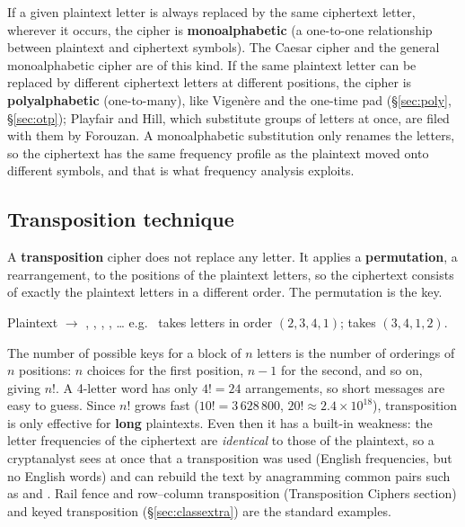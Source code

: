 If a given plaintext letter is always replaced by the same ciphertext letter, wherever it occurs, the cipher is \textbf{monoalphabetic} (a one-to-one relationship between plaintext and ciphertext symbols). The Caesar cipher and the general monoalphabetic cipher are of this kind. If the same plaintext letter can be replaced by different ciphertext letters at different positions, the cipher is \textbf{polyalphabetic} (one-to-many), like Vigen\`ere and the one-time pad (\S\ref{sec:poly}, \S\ref{sec:otp}); Playfair and Hill, which substitute groups of letters at once, are filed with them by Forouzan. A monoalphabetic substitution only renames the letters, so the ciphertext has the same frequency profile as the plaintext moved onto different symbols, and that is what frequency analysis exploits.

\subsection{Transposition technique}
A \textbf{transposition} cipher does not replace any letter. It applies a \textbf{permutation}, a rearrangement, to the positions of the plaintext letters, so the ciphertext consists of exactly the plaintext letters in a different order. The permutation is the key.

Plaintext  $\to$ , , , , \dots
\quad e.g.\  takes letters in order $(2,3,4,1)$;  takes $(3,4,1,2)$.

The number of possible keys for a block of $n$ letters is the number of orderings of $n$ positions: $n$ choices for the first position, $n - 1$ for the second, and so on, giving $n!$. A 4-letter word has only $4! = 24$ arrangements, so short messages are easy to guess. Since $n!$ grows fast ($10! = 3\,628\,800$, $20! \approx 2.4 \times 10^{18}$), transposition is only effective for \textbf{long} plaintexts. Even then it has a built-in weakness: the letter frequencies of the ciphertext are \emph{identical} to those of the plaintext, so a cryptanalyst sees at once that a transposition was used (English frequencies, but no English words) and can rebuild the text by anagramming common pairs such as  and . Rail fence and row--column transposition (Transposition Ciphers section) and keyed transposition (\S\ref{sec:classextra}) are the standard examples.

